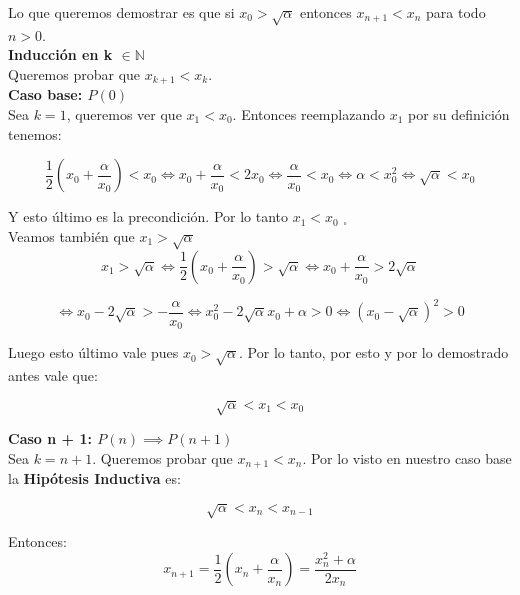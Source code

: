 Lo que queremos demostrar es que si $x_0 > \sqrt{\alpha}$ entonces $x_{n + 1} < x_n$ para todo $n > 0$.\\

{\large \bf Inducción en k $\in \mathbb{N}$}\\
Queremos probar que $x_{k + 1} < x_k$.\\

{\bf Caso base: $P(0)$}\\
Sea $k = 1$, queremos ver que $x_1 < x_0$. Entonces reemplazando $x_1$ por su definición tenemos:

\begin{displaymath}
    \frac{1}{2}(x_0 + \frac{\alpha}{x_0}) < x_0 \iff x_0 + \frac{\alpha}{x_0} < 2x_0 \iff \frac{\alpha}{x_0} < x_0 \iff \alpha < x_0^2 \iff \sqrt{\alpha} < x_0
\end{displaymath}

Y esto último es la precondición. Por lo tanto $x_1 < x_0$ $_\square$\\

Veamos también que $x_1 > \sqrt{\alpha}$\\

\begin{displaymath}
    x_1 > \sqrt{\alpha} \iff \frac{1}{2}(x_0 + \frac{\alpha}{x_0}) > \sqrt{\alpha} \iff x_0 + \frac{\alpha}{x_0} > 2\sqrt{\alpha}
\end{displaymath}

\begin{displaymath}
    \iff x_0 - 2\sqrt{\alpha} > -\frac{\alpha}{x_0} \iff x_0^2 - 2\sqrt{\alpha}x_0 + \alpha > 0 \iff (x_0 - \sqrt{\alpha})^2 > 0
\end{displaymath}

Luego esto último vale pues $x_0 > \sqrt{\alpha}$. Por lo tanto, por esto y por lo demostrado antes vale que:

\begin{displaymath}
    \sqrt{\alpha} < x_1 < x_0
\end{displaymath}

{\bf Caso n + 1: $P(n) \implies P(n + 1)$}\\
Sea $k = n + 1$. Queremos probar que $x_{n + 1} < x_n$. Por lo visto en nuestro caso base la {\bf Hipótesis Inductiva} es:

\begin{displaymath}
    \sqrt{\alpha} < x_n < x_{n - 1}
\end{displaymath}

Entonces:
\begin{displaymath}
    x_{n + 1} = \frac{1}{2}(x_n + \frac{\alpha}{x_n}) = \frac{x_n^2 + \alpha}{2x_n}
\end{displaymath}

